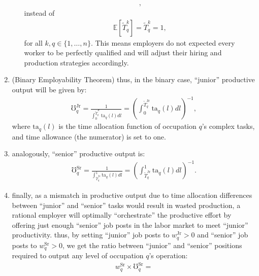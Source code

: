 \documentclass[hidelinks, nonatbib]{elsarticle}
\begin{document}
\begin{enumerate}
\begin{enumerate}
\begin{gather}
            ,
        \end{gather}
        instead of 
        \begin{gather}
            \mathbb{E}[
                \tilde{T}_{q}^{k}
            ]
            =
            \tilde{T}_{q}^{k}
            = 1
            ,
        \end{gather}
        for all $k,q \in \{1, \dots, n\}$. This means employers do not expected every worker to be perfectly qualified and will adjust their hiring and production strategies accordingly.
    \end{enumerate}
    \item (Binary Employability Theorem) thus, in the binary case, ``junior'' productive output will be given by:
    \begin{gather}
        \mho_{q}^{\text{Jr}} =
        \frac{
            1
        }{
            \int_{0}^{\tilde{T}_{q}^{\text{Jr}}}
            \text{ta}_q(l)
            dl
        } = 
        \left(
            \int_{0}^{\tilde{T}_{q}^{\text{Jr}}}
                \text{ta}_q(l)
                dl
        \right) ^ {-1}
        ,
    \end{gather}
    where $\text{ta}_q(l)$ is the time allocation function of occupation $q$'s complex tasks, and time allowance (the numerator) is set to one.
    \item analogously, ``senior'' productive output is:
    \begin{gather}
        \mho_{q}^{\text{Sr}} =
        \frac{
            1
        }{
            \int_{\tilde{T}_{q}^{\text{Jr}}}^{1}
            \text{ta}_q(l)
            dl
        } = 
        \left(
            \int_{\tilde{T}_{q}^{\text{Jr}}}^{1}
                \text{ta}_q(l)
                dl
        \right) ^ {-1}
        .
    \end{gather}
    \item finally, as a mismatch in productive output due to time allocation differences between ``junior'' and ``senior'' tasks would result in wasted production, a rational employer will optimally ``orchestrate'' the productive effort by offering just enough ``senior'' job posts in the labor market to meet ``junior'' productivity. thus, by setting ``junior'' job posts to $w_{q}^{\text{Jr}} > 0$ and ``senior'' job posts to $w_{q}^{\text{Sr}} > 0$, we get the ratio between ``junior'' and ``senior'' positions required to output any level of occupation $q$'s operation:
    \begin{gather}
        w_{q}^{\text{Sr}} \times 
        \mho_{q}^{\text{Sr}} = 

\end{gather}
\end{enumerate}
\end{document}
